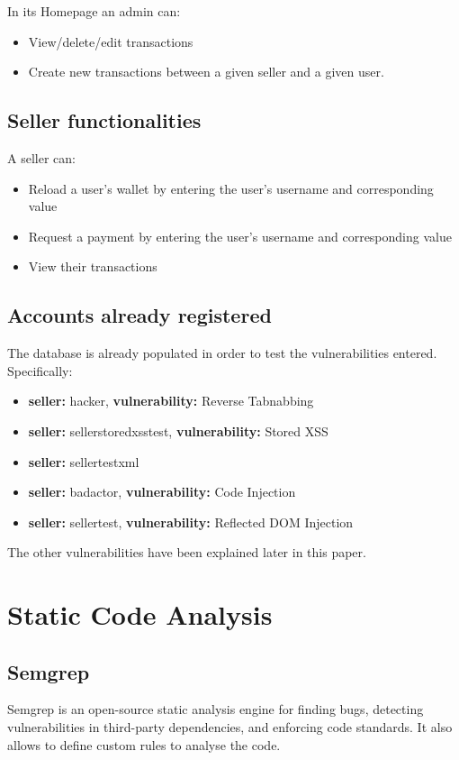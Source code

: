 \documentclass[]{article}
\begin{document}
In its Homepage an admin can:
\begin{itemize}
    \item View/delete/edit transactions
    \item Create new transactions between a given seller and a given user. 
\end{itemize}

\subsection{Seller functionalities}
A seller can:
\begin{itemize}
    \item Reload a user's wallet by entering the user's username and corresponding value
    \item Request a payment by entering the user's username and corresponding value
    \item View their transactions 
\end{itemize}

\subsection{Accounts already registered}
The database is already populated in order to test the vulnerabilities entered. Specifically:
\begin{itemize}
    \item \textbf{seller:} hacker, \textbf{vulnerability:} Reverse Tabnabbing
    \item \textbf{seller:} sellerstoredxsstest, \textbf{vulnerability:} Stored XSS
    \item \textbf{seller:} sellertestxml
    \item \textbf{seller:} badactor, \textbf{vulnerability:} Code Injection 
    \item \textbf{seller:} sellertest, \textbf{vulnerability:} Reflected DOM Injection
\end{itemize}
The other vulnerabilities have been explained later in this paper.

\section{Static Code Analysis}

\subsection{Semgrep}
Semgrep is an open-source static analysis engine for finding bugs, detecting vulnerabilities in third-party dependencies, 
and enforcing code standards. It also allows to define custom rules to analyse the code. 
\end{document}
